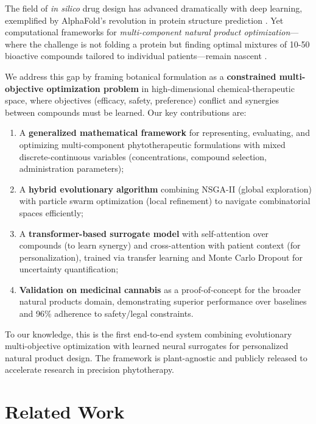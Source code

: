 \documentclass[11pt,a4paper]{article}
\begin{document}
The field of \textit{in silico} drug design has advanced dramatically with deep learning, exemplified by AlphaFold's revolution in protein structure prediction \cite{Jumper2021}. Yet computational frameworks for \textit{multi-component natural product optimization}—where the challenge is not folding a protein but finding optimal mixtures of 10-50 bioactive compounds tailored to individual patients—remain nascent \cite{Newman2020,Atanasov2021}.

We address this gap by framing botanical formulation as a \textbf{constrained multi-objective optimization problem} in high-dimensional chemical-therapeutic space, where objectives (efficacy, safety, preference) conflict and synergies between compounds must be learned. Our key contributions are:

\begin{enumerate}
    \item A \textbf{generalized mathematical framework} for representing, evaluating, and optimizing multi-component phytotherapeutic formulations with mixed discrete-continuous variables (concentrations, compound selection, administration parameters);
    
    \item A \textbf{hybrid evolutionary algorithm} combining NSGA-II (global exploration) with particle swarm optimization (local refinement) to navigate combinatorial spaces efficiently;
    
    \item A \textbf{transformer-based surrogate model} with self-attention over compounds (to learn synergy) and cross-attention with patient context (for personalization), trained via transfer learning and Monte Carlo Dropout for uncertainty quantification;
    
    \item \textbf{Validation on medicinal cannabis} as a proof-of-concept for the broader natural products domain, demonstrating superior performance over baselines and 96\% adherence to safety/legal constraints.
\end{enumerate}

To our knowledge, this is the first end-to-end system combining evolutionary multi-objective optimization with learned neural surrogates for personalized natural product design. The framework is plant-agnostic and publicly released to accelerate research in precision phytotherapy.

\section{Related Work}
\end{document}
